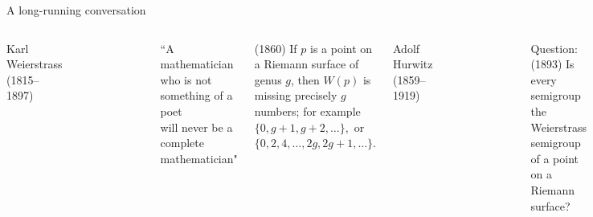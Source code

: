 \documentclass[12pt, aspectratio=169]{beamer}
\begin{document}
 \begin{frame}{A long-running conversation}
 
\begin{columns}
\alert{Karl Weierstrass} (1815--1897)
\begin{figure}
    \flushleft
    \includegraphics[width=.3\textwidth]{"KarlWeierstrassSmall.pdf"}
\end{figure}
  
\begin{small}
 ``A mathematician who is not something of a poet\\ will never be a complete mathematician" 
\end{small}
 \smallskip
 
(1860) If $p$ is a point on a Riemann surface of genus $g$,
 then $W(p)$ is missing precisely $g$ numbers; for example
 $
\{0,g+1,g+2,\dots\},
 $
 or
$
\{0,2, 4,\dots, 2g, 2g+1,\dots\}.
 $
 
\alert{Adolf Hurwitz} (1859--1919)
\begin{figure}
    \flushleft
    \includegraphics[width=.4\textwidth]{"Adolf_Hurwitz.jpg"}
\end{figure}
\begin{small}
 Question:(1893) 
Is every semigroup the Weierstrass semigroup of a point
on a Riemann surface?
 \end{small}
\end{columns}

\end{frame}
\end{document}
